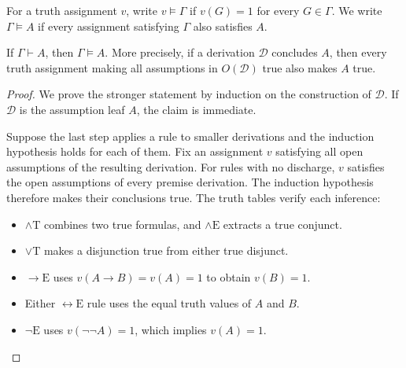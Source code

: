 \documentclass[11pt,a4paper]{amsart}
\begin{document}
For a truth assignment \(v\), write \(v\models\Gamma\) if \(v(G)=1\) for
every \(G\in\Gamma\). We write \(\Gamma\models A\) if every assignment
satisfying \(\Gamma\) also satisfies \(A\).

\begin{theorem}
  If \(\Gamma\vdash A\), then \(\Gamma\models A\). More precisely, if a
  derivation \(\mathcal D\) concludes \(A\), then every truth assignment
  making all assumptions in \(O(\mathcal D)\) true also makes \(A\) true.
\end{theorem}

\begin{proof}
  We prove the stronger statement by induction on the construction of
  \(\mathcal D\). If \(\mathcal D\) is the assumption leaf \(A\), the
  claim is immediate.

  Suppose the last step applies a rule to smaller derivations and the
  induction hypothesis holds for each of them. Fix an assignment \(v\)
  satisfying all open assumptions of the resulting derivation. For rules
  with no discharge, \(v\) satisfies the open assumptions of every premise
  derivation. The induction hypothesis therefore makes their conclusions
  true. The truth tables verify each inference:
  \begin{itemize}
    \item \(\land\mathrm T\) combines two true formulas, and
      \(\land\mathrm E\) extracts a true conjunct.
    \item \(\lor\mathrm T\) makes a disjunction true from either true
      disjunct.
    \item \(\to\mathrm E\) uses \(v(A\to B)=v(A)=1\) to obtain
      \(v(B)=1\).
    \item Either \(\leftrightarrow\mathrm E\) rule uses the equal truth
      values of \(A\) and \(B\).
    \item \(\neg\mathrm E\) uses \(v(\neg\neg A)=1\), which implies
      \(v(A)=1\).
  \end{itemize}


\end{proof}
\end{document}
